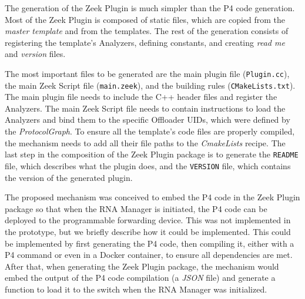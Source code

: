 The generation of the Zeek Plugin is much simpler than the P4 code generation. Most of the Zeek Plugin is composed of static files, which are copied from the \textit{master template} and from the templates. The rest of the generation consists of registering the template's Analyzers, defining constants, and creating \textit{read me} and \textit{version} files.

The most important files to be generated are the main plugin file (\texttt{Plugin.cc}), the main Zeek Script file (\texttt{main.zeek}), and the building rules (\texttt{CMakeLists.txt}). The main plugin file needs to include the C++ header files and register the Analyzers. The main Zeek Script file needs to contain instructions to load the Analyzers and bind them to the specific Offloader UIDs, which were defined by the \textit{ProtocolGraph}. To ensure all the template's code files are properly compiled, the mechanism needs to add all their file paths to the \textit{CmakeLists} recipe. The last step in the composition of the Zeek Plugin package is to generate the \texttt{README} file, which describes what the plugin does, and the \texttt{VERSION} file, which contains the version of the generated plugin.

The proposed mechanism was conceived to embed the P4 code in the Zeek Plugin package so that when the RNA Manager is initiated, the P4 code can be deployed to the programmable forwarding device. This was not implemented in the prototype, but we briefly describe how it could be implemented. This could be implemented by first generating the P4 code, then compiling it, either with a P4 command or even in a Docker container, to ensure all dependencies are met. After that, when generating the Zeek Plugin package, the mechanism would embed the output of the P4 code compilation (a \textit{JSON} file) and generate a function to load it to the switch when the RNA Manager was initialized.

